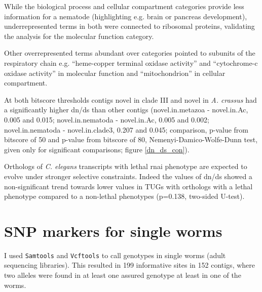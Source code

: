 While the biological process and cellular compartment categories
provide less information for a nematode (highlighting e.g. brain or
pancreas development), underrepresented terms in both were connected
to ribosomal proteins, validating the analysis for the molecular
function category.

Other overrepresented terms abundant over categories pointed to
subunits of the respiratory chain e.g. ``heme-copper terminal oxidase
activity'' and ``cytochrome-c oxidase activity'' in molecular function
and ``mitochondrion'' in cellular compartment.

At both bitscore thresholds contigs novel in clade III and novel in
\textit{A. crassus} had a significantly higher dn/ds than other
contigs (novel.in.metazoa - novel.in.Ac, 0.005 and 0.015;
novel.in.nematoda - novel.in.Ac, 0.005 and 0.002; novel.in.nematoda -
novel.in.clade3, 0.207 and 0.045; comparison, p-value from bitscore of
50 and p-value from bitscore of 80, Nemenyi-Damico-Wolfe-Dunn test,
given only for significant comparisons; figure \ref{dn_ds_con}).


Orthologs of \textit{C. elegans} transcripts with lethal rnai
phenotype are expected to evolve under stronger selective
constraints. Indeed the values of dn/ds showed a non-significant trend
towards lower values in TUGs with orthologs with a lethal phenotype
compared to a non-lethal phenotypes (p=0.138, two-sided U-test).

\section{SNP markers for single worms}

I used \texttt{Samtools}\cite{journals/bioinformatics/LiHWFRHMAD09}
and \texttt{Vcftools}\cite{pmid21653522} to call genotypes in single
worms (adult sequencing libraries). This resulted in 199 informative
sites in 152 contigs, where two alleles were found in at least one
assured genotype at least in one of the worms.

